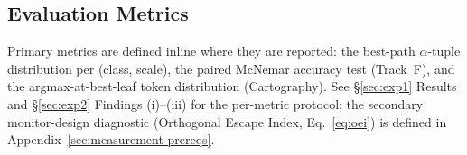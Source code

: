 

\subsection{Evaluation Metrics}
Primary metrics are defined inline where they are reported: the best-path $\alpha$-tuple distribution per (class, scale), the paired McNemar accuracy test (Track~F), and the argmax-at-best-leaf token distribution (Cartography). See §\ref{sec:exp1} Results and §\ref{sec:exp2} Findings (i)--(iii) for the per-metric protocol; the secondary monitor-design diagnostic (Orthogonal Escape Index, Eq.~\ref{eq:oei}) is defined in Appendix~\ref{sec:measurement-prereqs}.
